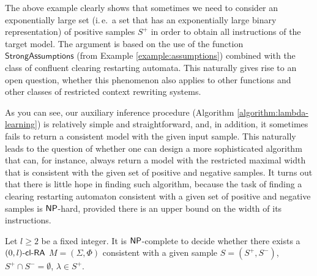 The above example clearly shows that sometimes we need to consider an exponentially large set (i.\,e.\ a set that has an exponentially large binary representation) of positive samples $S^+$ in order to obtain all instructions of the target model. The argument is based on the use of the function $\mathsf{StrongAssumptions}$ (from Example \ref{example:assumptions}) combined with the class of confluent clearing restarting automata. This naturally gives rise to an open question, whether this phenomenon also applies to other functions and other classes of restricted context rewriting systems.

As you can see, our auxiliary inference procedure (Algorithm \ref{algorithm:lambda-learning}) is relatively simple and straightforward, and, in addition, it sometimes fails to return a consistent model with the given input sample. This naturally leads to the question of whether one can design a more sophisticated algorithm that can, for instance, always return a model with the restricted maximal width that is consistent with the given set of positive and negative samples. It turns out that there is little hope in finding such algorithm, because the task of finding a clearing restarting automaton consistent with a given set of positive and negative samples is $\textup{\sf NP}$-hard, provided there is an upper bound on the width of its instructions.

\begin{theorem}[\cite{C12}]\label{theorem:0clrainference}
Let $l \ge 2$ be a fixed integer. It is $\textup{\sf NP}$-complete to decide whether there exists a $\textup{\sf $(0,l)$-\textup{\sf cl-RA\/}}$ $M = (\Sigma, \Phi)$ consistent with a given sample $S = (S^+, S^-)$, $S^+ \cap S^- = \emptyset$, $\lambda \in S^+$.
\end{theorem}

